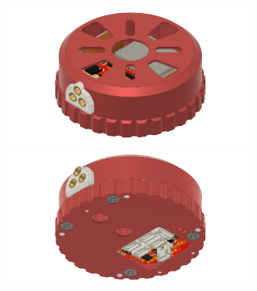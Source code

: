 \documentclass{../document_templates/documentation_template_latex/zubaxdoc}
\begin{document}
\begin{titlepage}
\centering
\includegraphics[width=0.6\textwidth]{top_view.png}
\includegraphics[width=0.6\textwidth]{bottom_view.png}
\end{titlepage}

\tableofcontents
\BeginRightColumn
\listoffigures
\listoftables

\mainmatter







\end{document}

